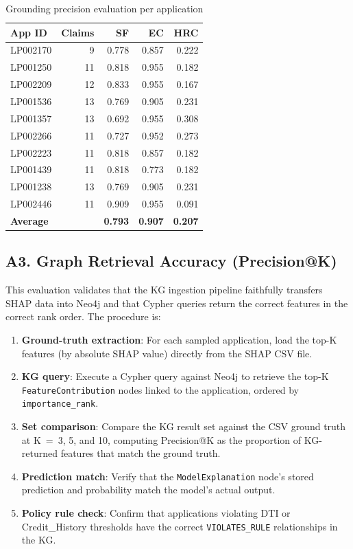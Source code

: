 \documentclass[lnbip]{svmultln}
\begin{document}
\begin{table}[htp]
    \centering
    \caption{Grounding precision evaluation per application}
    \label{tab:hallucination}
    \begin{tabular}{l r r r r}
        \toprule
        \textbf{App ID} & \textbf{Claims} & \textbf{SF} & \textbf{EC} & \textbf{HRC} \\
        \midrule
        LP002170 & 9 & 0.778 & 0.857 & 0.222 \\
        LP001250 & 11 & 0.818 & 0.955 & 0.182 \\
        LP002209 & 12 & 0.833 & 0.955 & 0.167 \\
        LP001536 & 13 & 0.769 & 0.905 & 0.231 \\
        LP001357 & 13 & 0.692 & 0.955 & 0.308 \\
        LP002266 & 11 & 0.727 & 0.952 & 0.273 \\
        LP002223 & 11 & 0.818 & 0.857 & 0.182 \\
        LP001439 & 11 & 0.818 & 0.773 & 0.182 \\
        LP001238 & 13 & 0.769 & 0.905 & 0.231 \\
        LP002446 & 11 & 0.909 & 0.955 & 0.091 \\
        \midrule
        \multicolumn{2}{l}{\textbf{Average}} & \textbf{0.793} & \textbf{0.907} & \textbf{0.207} \\
        \bottomrule
    \end{tabular}
\end{table}


\subsection{A3. Graph Retrieval Accuracy (Precision@K)}

This evaluation validates that the KG ingestion pipeline faithfully transfers SHAP data into Neo4j and that Cypher queries return the correct features in the correct rank order. The procedure is:

\begin{enumerate}
    \item \textbf{Ground-truth extraction}: For each sampled application, load the top-K features (by absolute SHAP value) directly from the SHAP CSV file.
    \item \textbf{KG query}: Execute a Cypher query against Neo4j to retrieve the top-K \texttt{FeatureContribution} nodes linked to the application, ordered by \texttt{importance\_rank}.
    \item \textbf{Set comparison}: Compare the KG result set against the CSV ground truth at K~=~3, 5, and 10, computing Precision@K as the proportion of KG-returned features that match the ground truth.
    \item \textbf{Prediction match}: Verify that the \texttt{ModelExplanation} node's stored prediction and probability match the model's actual output.
    \item \textbf{Policy rule check}: Confirm that applications violating DTI or Credit\_History thresholds have the correct \texttt{VIOLATES\_RULE} relationships in the KG.
\end{enumerate}
\end{document}
